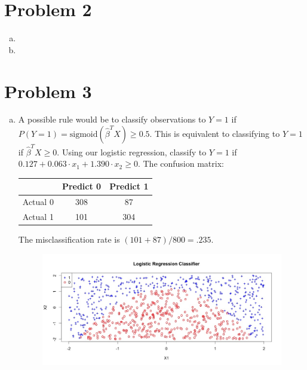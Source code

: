 \documentclass[12pt]{article}
\begin{document}
\section*{Problem 2}
\begin{enumerate}[(a)]
\item 
\item 
\end{enumerate}

\section*{Problem 3}
\begin{enumerate}[(a)]
\item A possible rule would be to classify observations to $Y=1$ if $P(Y=1) = \text{sigmoid}(\hat{\beta}^T X) \geq 0.5$. This is equivalent to classifying to $Y=1$ if $\hat{\beta}^T X \geq 0$. Using our logistic regression, classify to $Y=1$ if $0.127 + 0.063 \cdot x_1 + 1.390 \cdot x_2 \geq 0$. The confusion matrix:
\begin{table}[H] \center
\begin{tabular}{ccc} \hline
& Predict 0 & Predict 1 \\ \hline
Actual 0 & 308 &  87 \\ 
Actual 1 & 101 & 304 \\ \hline
\end{tabular}
\end{table}
The misclassification rate is $ (101+87) / 800 = .235$.
\begin{figure}[H]
\includegraphics[scale=.4]{y1_plot.jpeg}
\end{figure}


\end{enumerate}
\end{document}
